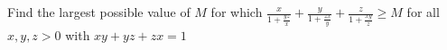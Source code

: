 Find the largest possible value of $M$ for which $\frac{x}{1+\frac{yz}{x}}+\frac{y}{1+\frac{zx}{y}}+\frac{z}{1+\frac{xy}{z}}\geq M$ for all $x,y,z>0$ with $xy+yz+zx=1$